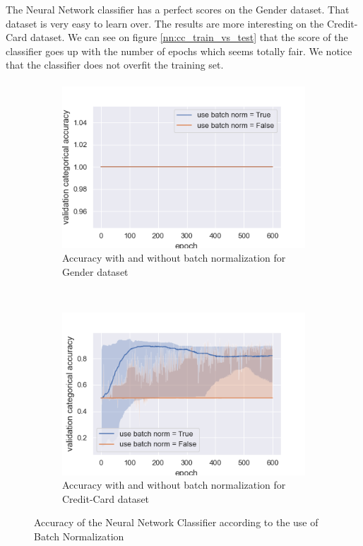 \documentclass[10pt]{article}
\begin{document}
			The Neural Network classifier has a perfect scores on the Gender dataset. That dataset is very easy to learn over. The results are more interesting on the Credit-Card dataset. We can see on figure \ref{nn:cc_train_vs_test} that the score of the classifier goes up with the number of epochs which seems totally fair. We notice that the classifier does not overfit the training set.
		\paragraph*{}
			\begin{figure}[h]
				\centering
				\begin{subfigure}[]{0.45\columnwidth}
					\centering
					\includegraphics[width=\linewidth]{../graphics/per_gender_epoch_score_type_use_batch_norm.png}
					\caption{Accuracy with and without batch normalization for Gender dataset}
					\label{nn:g_bn}
				\end{subfigure}
				~
				\begin{subfigure}[]{0.45\columnwidth}
					\centering
					\includegraphics[width=\linewidth]{../graphics/per_creditcard_epoch_score_type_use_batch_norm.png}
					\caption{Accuracy with and without batch normalization for Credit-Card dataset}
					\label{nn:cc_bn}
				\end{subfigure}
				\caption{Accuracy of the Neural Network Classifier according to the use of Batch Normalization}
				\label{nn:bn}
			\end{figure}
\end{document}
